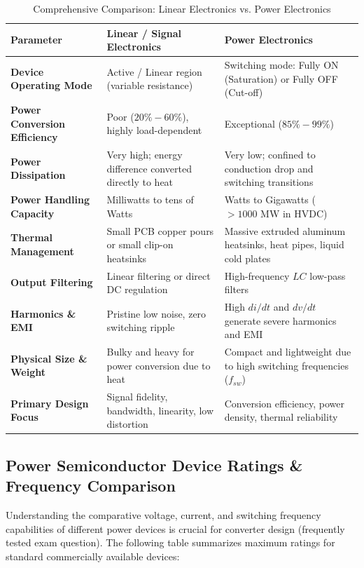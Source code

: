 \documentclass[11pt,a4paper]{article}
\begin{document}
\begin{table}[htbp]
\centering
\small
\caption{Comprehensive Comparison: Linear Electronics vs. Power Electronics}
\label{tab:pe_vs_linear}
\begin{tabularx}{\textwidth}{l p{6.5cm} X}
\toprule
\textbf{Parameter} & \textbf{Linear / Signal Electronics} & \textbf{Power Electronics} \\
\midrule
\textbf{Device Operating Mode} & Active / Linear region (variable resistance) & Switching mode: Fully ON (Saturation) or Fully OFF (Cut-off) \\
\textbf{Power Conversion Efficiency} & Poor ($20\% - 60\%$), highly load-dependent & Exceptional ($85\% - 99\%$) \\
\textbf{Power Dissipation} & Very high; energy difference converted directly to heat & Very low; confined to conduction drop and switching transitions \\
\textbf{Power Handling Capacity} & Milliwatts to tens of Watts & Watts to Gigawatts ($>1000\text{ MW}$ in HVDC) \\
\textbf{Thermal Management} & Small PCB copper pours or small clip-on heatsinks & Massive extruded aluminum heatsinks, heat pipes, liquid cold plates \\
\textbf{Output Filtering} & Linear filtering or direct DC regulation & High-frequency $LC$ low-pass filters \\
\textbf{Harmonics \& EMI} & Pristine low noise, zero switching ripple & High $di/dt$ and $dv/dt$ generate severe harmonics and EMI \\
\textbf{Physical Size \& Weight} & Bulky and heavy for power conversion due to heat & Compact and lightweight due to high switching frequencies ($f_{sw}$) \\
\textbf{Primary Design Focus} & Signal fidelity, bandwidth, linearity, low distortion & Conversion efficiency, power density, thermal reliability \\
\bottomrule
\end{tabularx}
\end{table}

\subsection{Power Semiconductor Device Ratings \& Frequency Comparison}

Understanding the comparative voltage, current, and switching frequency capabilities of different power devices is crucial for converter design (frequently tested exam question). The following table summarizes maximum ratings for standard commercially available devices:
\end{document}
